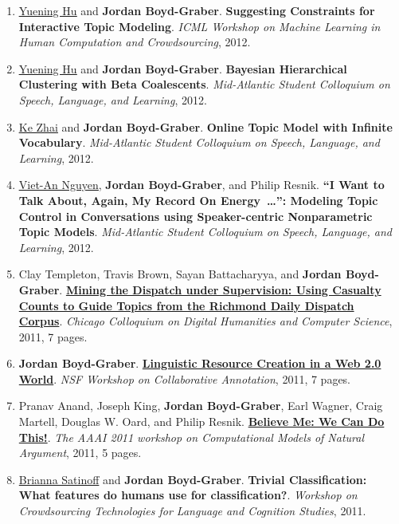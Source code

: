 {\begin{enumerate}
	 \item \underline{\href{https://scholar.google.com/citations?user=mO_62fQAAAAJ&hl=en}{Yuening Hu}} and {\bf Jordan Boyd-Graber}.  {\bf Suggesting Constraints for Interactive Topic Modeling}.  \emph{ICML Workshop on Machine Learning in Human Computation and Crowdsourcing}, 2012.

	 \item \underline{\href{https://scholar.google.com/citations?user=mO_62fQAAAAJ&hl=en}{Yuening Hu}} and {\bf Jordan Boyd-Graber}.  {\bf Bayesian Hierarchical Clustering with Beta Coalescents}.  \emph{Mid-Atlantic Student Colloquium on Speech, Language, and Learning}, 2012.

	 \item \underline{\href{https://kzhai.github.io/}{Ke Zhai}} and {\bf Jordan Boyd-Graber}.  {\bf Online Topic Model with Infinite Vocabulary}.  \emph{Mid-Atlantic Student Colloquium on Speech, Language, and Learning}, 2012.

	 \item \underline{\href{https://viet-an.github.io/}{Viet-An Nguyen}}, {\bf Jordan Boyd-Graber}, and Philip Resnik.  {\bf ``I Want to Talk About, Again, My Record On Energy~\dots'':  Modeling
  Topic Control in Conversations using Speaker-centric Nonparametric Topic Models}.  \emph{Mid-Atlantic Student Colloquium on Speech, Language, and Learning}, 2012.

	 \item Clay Templeton, Travis Brown, Sayan Battacharyya, and {\bf Jordan Boyd-Graber}.  {\bf \href{http://cs.umd.edu/~jbg//docs/slda_civil_war.pdf}{Mining the Dispatch under Supervision: Using Casualty Counts to Guide Topics from the Richmond Daily Dispatch Corpus}}.  \emph{Chicago Colloquium on Digital Humanities and Computer Science}, 2011, 7 pages.

	 \item {\bf Jordan Boyd-Graber}.  {\bf \href{http://cs.umd.edu/~jbg//docs/2011_resources.pdf}{Linguistic Resource Creation in a Web 2.0 World}}.  \emph{NSF Workshop on Collaborative Annotation}, 2011, 7 pages.

	 \item Pranav Anand, Joseph King, {\bf Jordan Boyd-Graber}, Earl Wagner, Craig Martell, Douglas W. Oard, and Philip Resnik.  {\bf \href{http://cs.umd.edu/~jbg//docs/2011_aaaiws_persuasion.pdf}{Believe Me: We Can Do This!}}.  \emph{The AAAI 2011 workshop on Computational Models of Natural Argument}, 2011, 5 pages.

	 \item \underline{Brianna Satinoff} and {\bf Jordan Boyd-Graber}.  {\bf Trivial Classification: What features do humans use for classification?}.  \emph{Workshop on Crowdsourcing Technologies for Language and Cognition Studies}, 2011.


\end{enumerate}}
